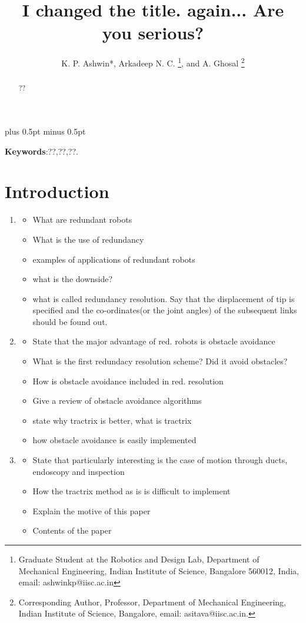 \documentclass[11pt,a4paper]{article}
\begin{document}
%
\title{I changed the title. again... Are you serious?}
%
%
\author{K. P. Ashwin*, Arkadeep N. C.
\thanks{Graduate Student at the Robotics and Design Lab, Department
of Mechanical Engineering, Indian Institute of Science, Bangalore 560012, India, email: ashwinkp@iisc.ac.in}, 
 and A. Ghosal
\thanks{Corresponding Author, Professor, Department of Mechanical Engineering, Indian Institute of Science, Bangalore, email: asitava@iisc.ac.in.}}
%
\baselineskip 12pt plus 0.5pt minus 0.5pt 
%
\date{}
\maketitle
\begin{abstract}
\label{sec:abstract}
??
\end{abstract}

\textbf{Keywords}:??,??,??.
\linenumbers

\section{Introduction}
\label{sec:introduction}
\begin{enumerate}
\item
\begin{itemize}
\item What are redundant robots
\item What is the use of redundancy
\item examples of applications of redundant robots
\item what is the downside?
\item what is called redundancy resolution. Say that the displacement of tip is specified and the co-ordinates(or the joint angles) of the subsequent links should be found out.
\end{itemize}

\item
\begin{itemize}
\item State that the major advantage of red. robots is obstacle avoidance
\item What is the first redundacy resolution scheme? Did it avoid obstacles?
\item How is obstacle avoidance included in red. resolution
\item Give a review of obstacle avoidance algorithms
\item state why tractrix is better, what is tractrix
\item how obstacle avoidance is easily implemented
\end{itemize}

\item
\begin{itemize}
\item State that particularly interesting is the case of motion through ducts, endoscopy and inspection
\item How the tractrix method as is is difficult to implement
\item Explain the motive of this paper
\item Contents of the paper
\end{itemize}
\end{enumerate}
\end{document}
